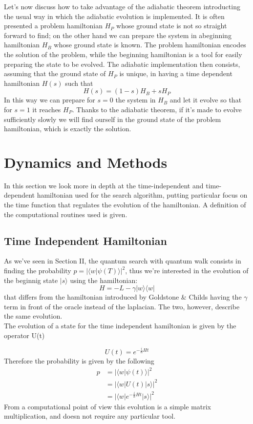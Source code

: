 \documentclass[aps,pra,reprint, onecolumn]{revtex4-2}
\begin{document}
Let's now discuss how to take advantage of the adiabatic theorem introducting the usual way in which the adiabatic evolution is implemented. It is often presented a problem hamiltonian $H_P$ whose ground state is not so straight forward to find; on the other hand we can prepare the system in abeginning hamiltonian $H_B$ whose ground state is known. The problem hamiltonian encodes the solution of the problem, while the beginning hamiltonian is a tool for easily preparing the state to be evolved. The adiabatic implementation then consists, assuming that the ground state of $H_P$ is unique, in having a time dependent hamiltonian $H(s)$ such that
\begin{equation}
	H(s) = (1-s)H_B + s H_P
\end{equation}
In this way we can prepare for $s=0$ the system in $H_B$ and let it evolve so that for $s=1$ it reaches $H_P$. Thanks to the adiabatic theorem, if it's made to evolve sufficiently slowly we will find ourself in the ground state of the problem hamiltonian, which is exactly the solution.


\section{Dynamics and Methods}
In this section we look more in depth at the time-independent and time-dependent hamiltonian used for the search algorithm, putting particular focus on the time function that regulates the evolution of the hamiltonian. A definition of the computational routines used is given.
\subsection{Time Independent Hamiltonian}
As we've seen in Section II, the quantum search with quantum walk consists in finding the probability $p = |\langle w|\psi(T)\rangle|^2$, thus we're interested in the evolution of the beginnig state $|s\rangle$ using the hamiltonian:
\begin{equation}
H = -L -\gamma|w\rangle\langle w|
\end{equation}
that differs from the hamiltonian introduced by Goldstone \& Childs having the $\gamma$ term in front of the oracle instead of the laplacian. The two, however, describe the same evolution. \\
The evolution of a state for the time independent hamiltonian is given by the operator U(t)

\begin{equation}
  U(t) = e^{-\frac{i}{\hbar}Ht}
\end{equation}
Therefore the probability is given by the following
\begin{equation*}
\begin{split}
  p & = |\langle w|\psi(t)\rangle|^2  \\ & = |\langle w|U(t)|s\rangle| ^2 \\& =|\langle w|e^{-\frac{i}{\hbar}Ht}|s\rangle|^2
\end{split}
\end{equation*}
From a computational point of view this evolution is a simple matrix multiplication, and doesn not require any particular tool.
\end{document}
